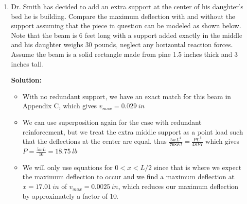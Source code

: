 \documentclass[12pt, oneside]{article}
\let\US\SI
\begin{document}
\begin{enumerate}
	\item 
		Dr. Smith has decided to add an extra support at the center of his daughter's bed he is building.
		Compare the maximum deflection with and without the support assuming that the piece in question can be modeled as shown below.
		Note that the beam is 6 feet long with a support added exactly in the middle and his daughter weighs 30 pounds, neglect any horizontal reaction forces.
		Assume the beam is a solid rectangle made from pine 1.5 inches thick and 3 inches tall.
		\begin{figure}[htpb]
		\begin{center}
		\end{center}
		\end{figure}
			\textbf{Solution:}
			\begin{itemize}
				\item With no redundant support, we have an exact match for this beam in Appendix C, which gives $v_{max} = 	\US{0.029}{in} $
				\item We can use superposition again for the case with redundant reinforcement, but we treat the extra middle support as a point load such that the deflections at the center are equal, thus $\frac{5wL^4}{768EI}=\frac{PL^3}{48EI}$ which gives $P = \frac{5wL}{16} = 	\US{18.75}{lb} $
				\item We will only use equations for $0 < x < L/2$ since that is where we expect the maximum deflection to occur and we find a maximum deflection at $x = 	\US{17.01}{in} $ of $v_{max} = 	\US{0.0025}{in} $, which reduces our maximum deflection by approximately a factor of 10.
			\end{itemize}

\end{enumerate}
\end{document}
